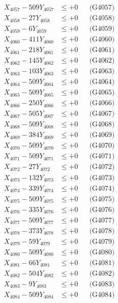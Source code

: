 \documentclass[a4paper,10pt]{article}
\begin{document}
{\begin{align}
X_{4057} - 509Y_{4057} &\leq +0 && \text{(G4057)} \\
X_{4058} - 27Y_{4058} &\leq +0 && \text{(G4058)} \\
X_{4059} - 6Y_{4059} &\leq +0 && \text{(G4059)} \\
X_{4060} - 411Y_{4060} &\leq +0 && \text{(G4060)} \\
\allowbreak
X_{4061} - 218Y_{4061} &\leq +0 && \text{(G4061)} \\
X_{4062} - 145Y_{4062} &\leq +0 && \text{(G4062)} \\
X_{4063} - 103Y_{4063} &\leq +0 && \text{(G4063)} \\
X_{4064} - 509Y_{4064} &\leq +0 && \text{(G4064)} \\
X_{4065} - 509Y_{4065} &\leq +0 && \text{(G4065)} \\
X_{4066} - 250Y_{4066} &\leq +0 && \text{(G4066)} \\
X_{4067} - 505Y_{4067} &\leq +0 && \text{(G4067)} \\
X_{4068} - 509Y_{4068} &\leq +0 && \text{(G4068)} \\
X_{4069} - 384Y_{4069} &\leq +0 && \text{(G4069)} \\
X_{4070} - 509Y_{4070} &\leq +0 && \text{(G4070)} \\
\allowbreak
X_{4071} - 509Y_{4071} &\leq +0 && \text{(G4071)} \\
X_{4072} - 27Y_{4072} &\leq +0 && \text{(G4072)} \\
X_{4073} - 132Y_{4073} &\leq +0 && \text{(G4073)} \\
X_{4074} - 339Y_{4074} &\leq +0 && \text{(G4074)} \\
X_{4075} - 509Y_{4075} &\leq +0 && \text{(G4075)} \\
X_{4076} - 335Y_{4076} &\leq +0 && \text{(G4076)} \\
X_{4077} - 509Y_{4077} &\leq +0 && \text{(G4077)} \\
X_{4078} - 373Y_{4078} &\leq +0 && \text{(G4078)} \\
X_{4079} - 59Y_{4079} &\leq +0 && \text{(G4079)} \\
X_{4080} - 509Y_{4080} &\leq +0 && \text{(G4080)} \\
\allowbreak
X_{4081} - 66Y_{4081} &\leq +0 && \text{(G4081)} \\
X_{4082} - 504Y_{4082} &\leq +0 && \text{(G4082)} \\
X_{4083} - 9Y_{4083} &\leq +0 && \text{(G4083)} \\
X_{4084} - 509Y_{4084} &\leq +0 && \text{(G4084)} \\

\end{align}}
\end{document}
